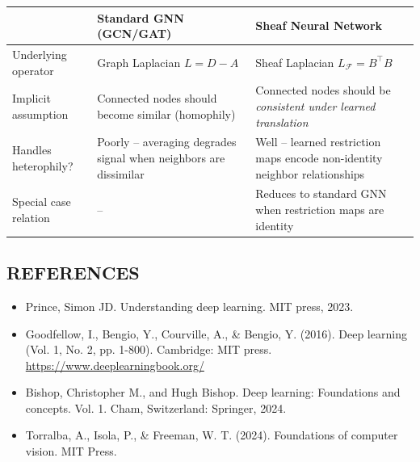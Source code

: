 \documentclass[12pt,a4paper]{article}
\begin{document}
\begin{center}
\renewcommand{\arraystretch}{1.3}
\begin{tabular}{|l|p{4.2cm}|p{4.2cm}|}
\hline
& \textbf{Standard GNN (GCN/GAT)} & \textbf{Sheaf Neural Network} \\
\hline
Underlying operator & Graph Laplacian $L = D-A$ & Sheaf Laplacian $L_{\mathcal{F}} = B^\top B$ \\
Implicit assumption & Connected nodes should become similar (homophily) & Connected nodes should be \emph{consistent under learned translation} \\
Handles heterophily? & Poorly -- averaging degrades signal when neighbors are dissimilar & Well -- learned restriction maps encode non-identity neighbor relationships \\
Special case relation & -- & Reduces to standard GNN when restriction maps are identity \\
\hline
\end{tabular}
\end{center}

\newpage

\subsection*{REFERENCES}
\begin{itemize}
    \item Prince, Simon JD. Understanding deep learning. MIT press, 2023.
    \item Goodfellow, I., Bengio, Y., Courville, A., \& Bengio, Y. (2016). Deep learning (Vol. 1, No. 2, pp. 1-800). Cambridge: MIT press. \url{https://www.deeplearningbook.org/}
    \item Bishop, Christopher M., and Hugh Bishop. Deep learning: Foundations and concepts. Vol. 1. Cham, Switzerland: Springer, 2024.
    \item Torralba, A., Isola, P., \& Freeman, W. T. (2024). Foundations of computer vision. MIT Press.
\end{itemize}
\end{document}
